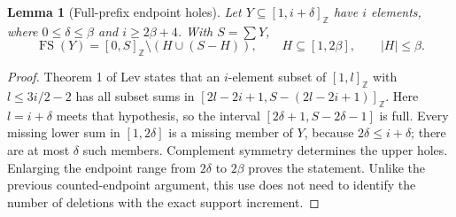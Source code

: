 \documentclass[11pt,a4paper]{article}
\newcommand{\FS}{\operatorname{FS}}
\newcommand{\Z}{\mathbb Z}
\newtheorem{lemma}[theorem]{Lemma}
\begin{document}
\begin{lemma}[Full-prefix endpoint holes]\label{fullprefix}
Let $Y\subseteq[1,i+\delta]_{\Z}$ have $i$ elements, where
$0\le\delta\le\beta$ and $i\ge2\beta+4$. With $S=\sum Y$,
\[
 \FS(Y)=[0,S]_{\Z}\setminus(H\cup(S-H)),\qquad
 H\subseteq[1,2\beta],\qquad |H|\le\beta.
\]
\end{lemma}
\begin{proof}
Theorem 1 of Lev \cite{lev} states that an $i$-element subset of
$[1,l]_{\Z}$ with $l\le3i/2-2$ has all subset sums in
$[2l-2i+1,S-(2l-2i+1)]_{\Z}$. Here $l=i+\delta$ meets that
hypothesis, so the interval $[2\delta+1,S-2\delta-1]$ is full.
Every missing lower sum in $[1,2\delta]$ is a missing member of $Y$,
because $2\delta\le i+\delta$; there are at most $\delta$ such
members. Complement symmetry determines the upper holes. Enlarging
the endpoint range from $2\delta$ to $2\beta$ proves the statement.
Unlike the previous counted-endpoint argument, this use does not need
to identify the number of deletions with the exact support increment.
\end{proof}
\end{document}
